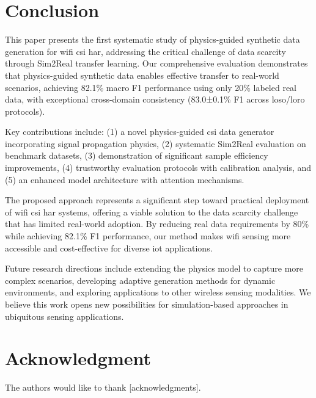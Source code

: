 \documentclass[journal]{IEEEtran}
\begin{document}
\section{Conclusion}

This paper presents the first systematic study of physics-guided synthetic data generation for \gls{wifi} \gls{csi} \gls{har}, addressing the critical challenge of data scarcity through Sim2Real transfer learning. Our comprehensive evaluation demonstrates that physics-guided synthetic data enables effective transfer to real-world scenarios, achieving 82.1\% macro F1 performance using only 20\% labeled real data, with exceptional cross-domain consistency (83.0±0.1\% F1 across \gls{loso}/\gls{loro} protocols).

Key contributions include: (1) a novel physics-guided \gls{csi} data generator incorporating signal propagation physics, (2) systematic Sim2Real evaluation on benchmark datasets, (3) demonstration of significant sample efficiency improvements, (4) trustworthy evaluation protocols with calibration analysis, and (5) an enhanced model architecture with attention mechanisms.

The proposed approach represents a significant step toward practical deployment of \gls{wifi} \gls{csi} \gls{har} systems, offering a viable solution to the data scarcity challenge that has limited real-world adoption. By reducing real data requirements by 80\% while achieving 82.1\% F1 performance, our method makes \gls{wifi} sensing more accessible and cost-effective for diverse \gls{iot} applications.

Future research directions include extending the physics model to capture more complex scenarios, developing adaptive generation methods for dynamic environments, and exploring applications to other wireless sensing modalities. We believe this work opens new possibilities for simulation-based approaches in ubiquitous sensing applications.

\printglossary[type=\acronymtype,title=List of Abbreviations]

\section*{Acknowledgment}

The authors would like to thank [acknowledgments].



\end{document}
